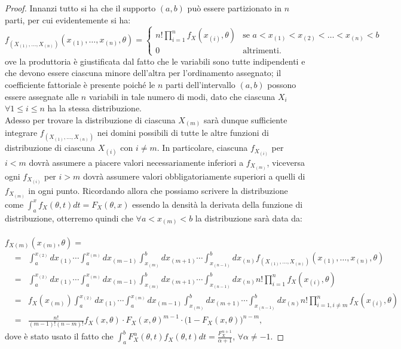 \begin{proof} Innanzi tutto si ha che il supporto $(a,b)$ può essere partizionato in $n$ parti, per cui evidentemente si ha: 
\footnotesize{
\begin{displaymath}
f_{(X_{(1)},\ldots,X_{(n)})}(x_{(1)},\ldots,x_{(n)},\theta)=
\left\{
\begin{array}{lr}
n!\prod_{i=1}^n f_{X}(x_{(i)},\theta) & \mbox{se } a<x_{(1)}<x_{(2)}<\ldots <x_{(n)}<b \\
0 & \mbox{altrimenti.}
\end{array}
\right.
\end{displaymath}
} \normalsize{ove la produttoria è giustificata dal fatto che le variabili sono tutte indipendenti e che devono essere ciascuna minore dell'altra per l'ordinamento assegnato; il coefficiente fattoriale è presente poiché le $n$ parti dell'intervallo $(a,b)$ possono essere assegnate alle $n$ variabili in tale numero di modi, dato che ciascuna $X_i$ $\forall 1\leq i\leq n$ ha la stessa distribuzione.  \\ Adesso per trovare la distribuzione di ciascuna $X_{(m)}$ sarà dunque sufficiente integrare $f_{(X_{(1)},\ldots,X_{(n)})}$ nei domini possibili di tutte le altre funzioni di distribuzione di ciascuna $X_{(i)}$ con $i\neq m$. In particolare, ciascuna $f_{X_{(i)}}$ per $i<m$ dovrà assumere a piacere valori necessariamente inferiori a $f_{X_{(m)}}$, viceversa ogni $f_{X_{(i)}}$ per $i>m$ dovrà assumere valori obbligatoriamente superiori a quelli di $f_{X_{(m)}}$ in ogni punto. Ricordando allora che possiamo scrivere la distribuzione come $\int_a^x f_X(\theta,t)dt=F_X(\theta,x)$ essendo la densità la derivata della funzione di distribuzione, otterremo quindi che $\forall a<x_{(m)}<b$ la distribuzione sarà data da: \\\\ $f_{X(m)}(x_{(m)},\theta)=$	}
\small{
\begin{eqnarray*}
&=&\int_a^{x_{(2)}} dx_{(1)}\cdots\int_a^{x_{(m)}} dx_{(m-1)}\int_{x_{(m)}}^b dx_{(m+1)}\cdots\int_{x_{(n-1)}}^b dx_{(n)}f_{(X_{(1)},\ldots,X_{(n)})}(x_{(1)},\ldots,x_{(n)},\theta)\\
&=&\int_a^{x_{(2)}} dx_{(1)}\cdots\int_a^{x_{(m)}} dx_{(m-1)}\int_{x_{(m)}}^b dx_{(m+1)}\cdots\int_{x_{(n-1)}}^b dx_{(n)} n!\prod_{i=1}^n f_{X}(x_{(i)},\theta) \\
&=& f_{X}(x_{(m)})\int_a^{x_{(2)}} dx_{(1)}\cdots\int_a^{x_{(m)}} dx_{(m-1)}\int_{x_{(m)}}^b dx_{(m+1)}\cdots\int_{x_{(n-1)}}^b dx_{(n)} n!\prod_{i=1,i\neq m}^n f_{X}(x_{(i)},\theta) \\
&=& \frac{n!}{(m-1)!(n-m)!}f_X\left(x,\theta\right)\cdot F_X\left(x,\theta\right)^{m-1}\cdot \big(1-F_X\left(x,\theta\right)\big)^{n-m}, 
\end{eqnarray*}
}
\normalsize{dove è stato usato il fatto che $\int_a^b F_X^\alpha(\theta, t)f_X(\theta,t)dt=\frac{F_X^{\alpha+1}}{\alpha+1}$, $\forall \alpha\neq -1$.}
\end{proof} 

